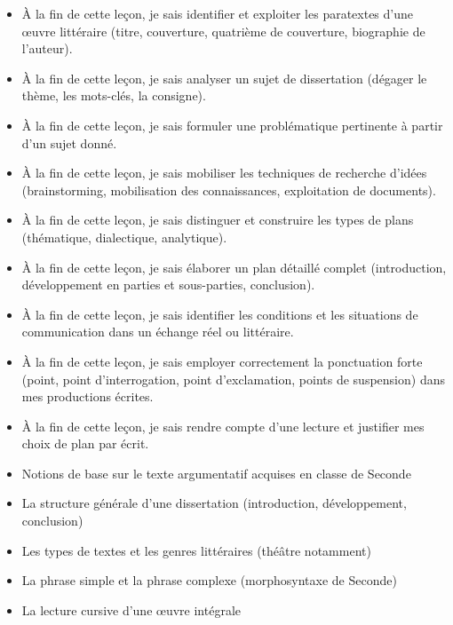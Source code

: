 \documentclass[11pt]{article}
\begin{document}
\begin{objectifs}
\begin{itemize}
\item À la fin de cette leçon, je sais identifier et exploiter les paratextes d'une œuvre littéraire (titre, couverture, quatrième de couverture, biographie de l'auteur).
\item À la fin de cette leçon, je sais analyser un sujet de dissertation (dégager le thème, les mots-clés, la consigne).
\item À la fin de cette leçon, je sais formuler une problématique pertinente à partir d'un sujet donné.
\item À la fin de cette leçon, je sais mobiliser les techniques de recherche d'idées (brainstorming, mobilisation des connaissances, exploitation de documents).
\item À la fin de cette leçon, je sais distinguer et construire les types de plans (thématique, dialectique, analytique).
\item À la fin de cette leçon, je sais élaborer un plan détaillé complet (introduction, développement en parties et sous-parties, conclusion).
\item À la fin de cette leçon, je sais identifier les conditions et les situations de communication dans un échange réel ou littéraire.
\item À la fin de cette leçon, je sais employer correctement la ponctuation forte (point, point d'interrogation, point d'exclamation, points de suspension) dans mes productions écrites.
\item À la fin de cette leçon, je sais rendre compte d'une lecture et justifier mes choix de plan par écrit.
\end{itemize}
\end{objectifs}

\begin{prerequis}
\begin{itemize}
\item Notions de base sur le texte argumentatif acquises en classe de Seconde
\item La structure générale d'une dissertation (introduction, développement, conclusion)
\item Les types de textes et les genres littéraires (théâtre notamment)
\item La phrase simple et la phrase complexe (morphosyntaxe de Seconde)
\item La lecture cursive d'une œuvre intégrale
\end{itemize}
\end{prerequis}
\end{document}
